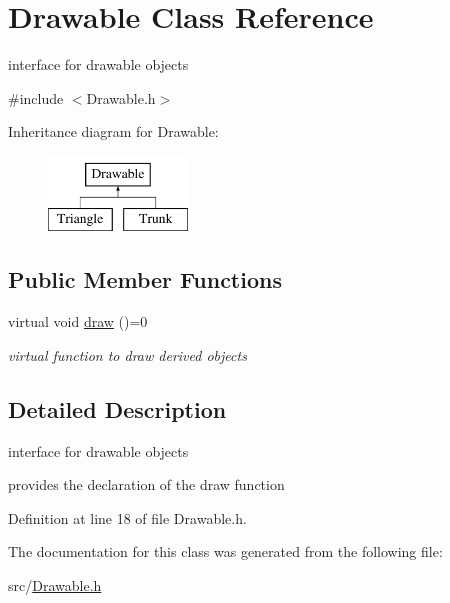 \hypertarget{class_drawable}{}\section{Drawable Class Reference}
\label{class_drawable}


interface for drawable objects  




{\ttfamily \#include $<$Drawable.\+h$>$}

Inheritance diagram for Drawable\+:\begin{figure}[H]
\begin{center}
\leavevmode
\includegraphics[height=2.000000cm]{d2/de4/class_drawable}
\end{center}
\end{figure}
\subsection*{Public Member Functions}
\begin{DoxyCompactItemize}
\item 
\mbox{\label{class_drawable_a33d68fe009d096c359bc55d64b5fb950}} 
virtual void \mbox{\hyperlink{class_drawable_a33d68fe009d096c359bc55d64b5fb950}{draw}} ()=0
\begin{DoxyCompactList}\small\item\em virtual function to draw derived objects \end{DoxyCompactList}\end{DoxyCompactItemize}


\subsection{Detailed Description}
interface for drawable objects 

provides the declaration of the draw function 

Definition at line 18 of file Drawable.\+h.



The documentation for this class was generated from the following file\+:\begin{DoxyCompactItemize}
\item 
src/\mbox{\hyperlink{_drawable_8h}{Drawable.\+h}}\end{DoxyCompactItemize}
